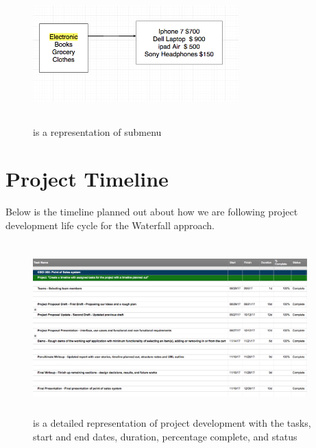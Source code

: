 \documentclass[10pt,conference,onecolumn,compsoc]{IEEEtran}
\begin{document}
\begin{figure}[H]
\includegraphics[height=200px, width=300px]{electronics}
\caption{is a representation of submenu}
\label{submenu}
\end{figure}



\section{Project Timeline}
 Below is the timeline planned out about how we are following project development life cycle for the Waterfall approach. 
 
\begin{figure}[H]
\includegraphics[height=250px, width=400px]{new}
\caption{is a detailed representation of project development with the tasks, start and end dates, duration, percentage complete, and status}
\label{PT}
\end{figure}
\end{document}
